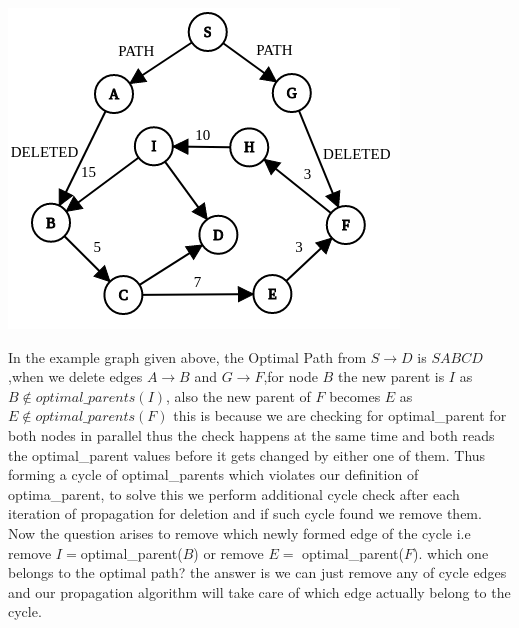 \documentclass[a4paper]{article}
\begin{document}
\begin{center}
\includegraphics[scale=0.45]{img/Delete_cycle.png}        
\end{center}
In the example graph given above, the Optimal Path from $S\rightarrow D$ is $SABCD$,when we delete edges $A \rightarrow B$ and $G \rightarrow F$,for node $B$ the new parent is $I$ as $B \notin optimal\_parents(I)$, also the new parent of $F$ becomes $E$ as $E \notin optimal\_parents(F)$ this is because we are checking for optimal\_parent for both nodes in parallel thus the check happens at the same time and both reads the optimal\_parent values before it gets changed by either one of them. Thus forming a cycle of optimal\_parents which violates our definition of optima\_parent, to solve this we perform additional cycle check after each iteration of propagation for deletion and if such cycle found we remove them.\\
Now the question arises to remove which newly formed edge of the cycle i.e remove $I= $optimal\_parent($B$) or remove $E=$ optimal\_parent($F$). which one belongs to the optimal path? the answer is we can just remove any of cycle edges and our propagation algorithm will take care of which edge actually belong to the cycle.\\

\end{document}
